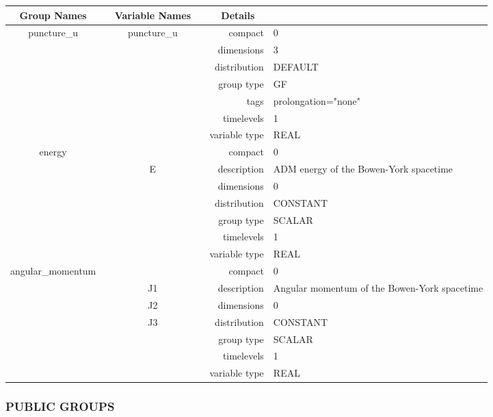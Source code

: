 \begin{tabular*}{150mm}{|c|c@{\extracolsep{\fill}}|rl|} \hline 
~ {\bf Group Names} ~ & ~ {\bf Variable Names} ~  &{\bf Details} ~ & ~\\ 
\hline 
puncture\_u & puncture\_u & compact & 0 \\ 
 &  & dimensions & 3 \\ 
 &  & distribution & DEFAULT \\ 
 &  & group type & GF \\ 
 &  & tags & prolongation="none" \\ 
 &  & timelevels & 1 \\ 
 &  & variable type & REAL \\ 
\hline 
energy &  & compact & 0 \\ 
 & E & description & ADM energy of the Bowen-York spacetime \\ 
 &  & dimensions & 0 \\ 
 &  & distribution & CONSTANT \\ 
 &  & group type & SCALAR \\ 
 &  & timelevels & 1 \\ 
 &  & variable type & REAL \\ 
\hline 
angular\_momentum &  & compact & 0 \\ 
 & J1 & description & Angular momentum of the Bowen-York spacetime \\ 
 & J2 & dimensions & 0 \\ 
 & J3 & distribution & CONSTANT \\ 
 &  & group type & SCALAR \\ 
 &  & timelevels & 1 \\ 
 &  & variable type & REAL \\ 
\hline 
\end{tabular*} 


\vspace{5mm}\subsubsection{PUBLIC GROUPS}

\vspace{5mm}

